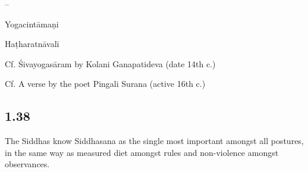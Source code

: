 \begin{ekdosis}
\begin{sources}[hp01_037]
--
\end{sources}

\begin{testimonia}[hp01_037]
Yogacintāmaṇi

\begin{versinnote}
\end{versinnote}

Haṭharatnāvalī

\begin{versinnote}
\end{versinnote}

Cf. Śivayogasāram by Kolani Ganapatideva (date 14th c.)

\begin{versinnote}
\end{versinnote}

Cf. A verse by the poet Pingali Surana (active 16th c.)

\begin{versinnote}
\end{versinnote}

\end{testimonia}

\subsection*{1.38}
\begin{translation}[hp01_038]
The Siddhas know Siddhasana as the single most important amongst
all postures, in the same way as measured diet amongst rules and non-violence amongst observances.
\end{translation}


\end{ekdosis}
